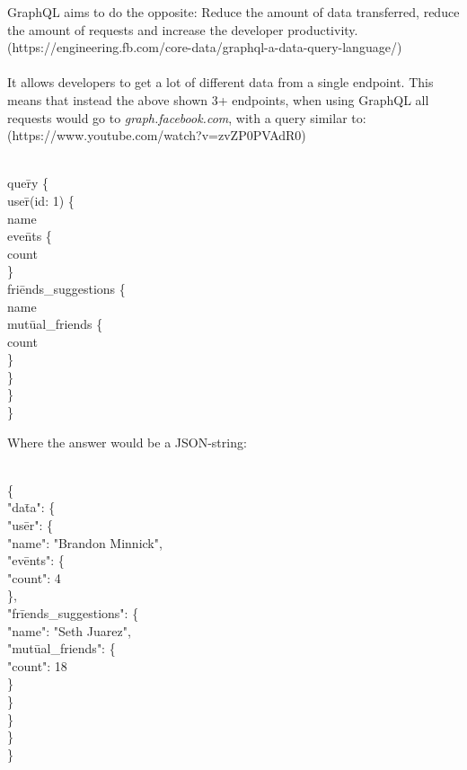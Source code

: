 GraphQL aims to do the opposite: Reduce the amount of data transferred, reduce the amount of requests and increase the developer productivity. (https://engineering.fb.com/core-data/graphql-a-data-query-language/) \\
\\
It allows developers to get a lot of different data from a single endpoint. This means that instead the above shown 3+ endpoints, when using GraphQL all requests would go to \emph{graph.facebook.com}, with a query similar to:\\ (https://www.youtube.com/watch?v=zvZP0PVAdR0)
\begin{exmp}
\label{ex21}
\begin{tabbing}
\\
que\=ry \{\\
\> use\=r(id: 1) \{\\
\> \> name\\
\> \> eve\=nts \{\\
\> \> \> count\\
\> \> \}\\
\> \> fri\=ends\_suggestions \{\\
\> \> \> name\\
\> \> \> mut\=ual\_friends \{\\
\> \> \> \> count\\
\> \> \> \}\\
\> \> \}\\
\> \}\\
\}
\end{tabbing}
\end{exmp}

\noindent
Where the answer would be a JSON-string:
\begin{exmp}
\begin{tabbing}
\\
\{ \= \\
\> "da\=ta": \{\\
\> \> "us\=er": \{\\
\> \> \> "name": "Brandon Minnick",\\
\> \> \> "ev\=ents": \{\\
\> \> \> \> "count": 4\\
\> \> \> \},\\
\> \> \> "fr\=iends\_suggestions": \{\\
\> \> \> \> "name": "Seth Juarez",\\
\> \> \> \> "mut\=ual\_friends": \{\\
\> \> \> \> \> "count": 18 \\
\> \> \> \> \}\\
\> \> \> \}\\
\> \> \}\\
\> \}\\
\}
\end{tabbing}
\end{exmp}

